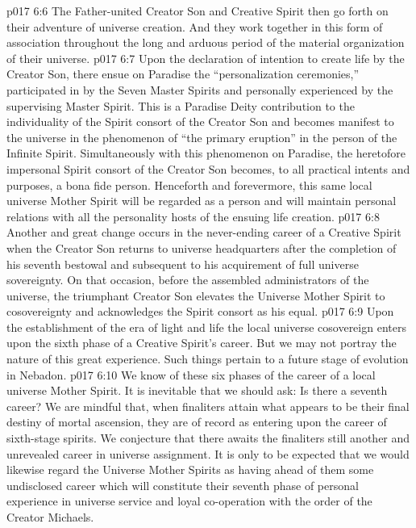 \vs p017 6:6 The Father\hyp{}united Creator Son and Creative Spirit then go forth on their adventure of universe creation. And they work together in this form of association throughout the long and arduous period of the material organization of their universe.
\vs p017 6:7 \bibnobreakspace {} Upon the declaration of intention to create life by the Creator Son, there ensue on Paradise the “personalization ceremonies,” participated in by the Seven Master Spirits and personally experienced by the supervising Master Spirit. This is a Paradise Deity contribution to the individuality of the Spirit consort of the Creator Son and becomes manifest to the universe in the phenomenon of “the primary eruption” in the person of the Infinite Spirit. Simultaneously with this phenomenon on Paradise, the heretofore impersonal Spirit consort of the Creator Son becomes, to all practical intents and purposes, a bona fide person. Henceforth and forevermore, this same local universe Mother Spirit will be regarded as a person and will maintain personal relations with all the personality hosts of the ensuing life creation.
\vs p017 6:8 \bibnobreakspace {} Another and great change occurs in the never\hyp{}ending career of a Creative Spirit when the Creator Son returns to universe headquarters after the completion of his seventh bestowal and subsequent to his acquirement of full universe sovereignty. On that occasion, before the assembled administrators of the universe, the triumphant Creator Son elevates the Universe Mother Spirit to cosovereignty and acknowledges the Spirit consort as his equal.
\vs p017 6:9 \bibnobreakspace {} Upon the establishment of the era of light and life the local universe cosovereign enters upon the sixth phase of a Creative Spirit’s career. But we may not portray the nature of this great experience. Such things pertain to a future stage of evolution in Nebadon.
\vs p017 6:10 \bibnobreakspace {} We know of these six phases of the career of a local universe Mother Spirit. It is inevitable that we should ask: Is there a seventh career? We are mindful that, when finaliters attain what appears to be their final destiny of mortal ascension, they are of record as entering upon the career of sixth\hyp{}stage spirits. We conjecture that there awaits the finaliters still another and unrevealed career in universe assignment. It is only to be expected that we would likewise regard the Universe Mother Spirits as having ahead of them some undisclosed career which will constitute their seventh phase of personal experience in universe service and loyal co\hyp{}operation with the order of the Creator Michaels.
